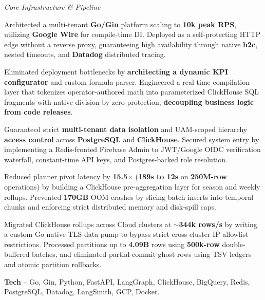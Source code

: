 \textcolor{Project}{\textit{Core Infrastructure \& Pipeline}}
\vspace{-0.65ex}
\begin{zitemize}
    \item Architected a multi-tenant \textbf{Go/Gin} platform scaling to \textbf{10k peak RPS}, utilizing \textbf{Google Wire} for compile-time DI. Deployed as a self-protecting HTTP edge without a reverse proxy, guaranteeing high availability through native \textbf{h2c}, nested timeouts, and \textbf{Datadog} distributed tracing.
    \item Eliminated deployment bottlenecks by \textbf{architecting a dynamic KPI configurator} and custom formula parser. Engineered a real-time compilation layer that tokenizes operator-authored math into parameterized ClickHouse SQL fragments with native division-by-zero protection, \textbf{decoupling business logic from code releases}.
    \item Guaranteed strict \textbf{multi-tenant data isolation} and UAM-scoped hierarchy \textbf{access control} across \textbf{PostgreSQL} and \textbf{ClickHouse}. Secured system entry by implementing a Redis-fronted Firebase Admin to JWT/Google OIDC verification waterfall, constant-time API keys, and Postgres-backed role resolution.
    \item Reduced planner pivot latency by \textbf{15.5$\times$} (\textbf{189s to 12s} on \textbf{250M-row} operations) by building a ClickHouse pre-aggregation layer for season and weekly rollups. Prevented \textbf{170GB} OOM crashes by slicing batch inserts into temporal chunks and enforcing strict distributed memory and disk-spill caps.
    \item Migrated ClickHouse rollups across Cloud clusters at $\sim$\textbf{344k rows/s} by writing a custom Go native-TLS data pump to bypass strict cross-cluster IP allowlist restrictions. Processed partitions up to \textbf{4.09B} rows using \textbf{500k-row} double-buffered batches, and eliminated partial-commit ghost rows using TSV ledgers and atomic partition rollbacks.
    \item \textbf{Tech} -- Go, Gin, Python, FastAPI, LangGraph, ClickHouse, BigQuery, Redis, PostgreSQL, Datadog, LangSmith, GCP, Docker.
\end{zitemize}
